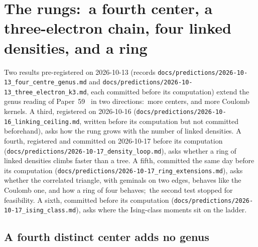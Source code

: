 \documentclass[aps,pra,twocolumn,superscriptaddress,longbibliography]{revtex4-2}
\begin{document}
\section{The rungs:\ a fourth center, a three-electron chain, four linked densities, and a ring}
\label{sec:beyond}

Two results pre-registered on 2026-10-13 (records
\texttt{docs/predictions/2026-10-13\_four\_centre\_genus.md} and
\texttt{docs/predictions/2026-10-13\_three\_electron\_k3.md}, each committed
before its computation) extend the genus reading of
Paper~59~\cite{loutey_paper59} in two directions:\ more centers, and more Coulomb
kernels.  A third, registered on 2026-10-16
(\texttt{docs/predictions/2026-10-16\_linking\_ceiling.md}, written before
its computation but not committed beforehand), asks how the rung grows with
the number of linked densities.  A fourth, registered and committed on
2026-10-17 before its computation
(\texttt{docs/predictions/2026-10-17\_density\_loop.md}), asks whether a
ring of linked densities climbs faster than a tree.  A fifth, committed the
same day before its computation
(\texttt{docs/predictions/2026-10-17\_ring\_extensions.md}), asks whether the
correlated triangle, with geminals on two edges, behaves like the Coulomb
one, and how a ring of four behaves;\ the second test stopped for feasibility.
A sixth, committed before its computation
(\texttt{docs/predictions/2026-10-17\_ising\_class.md}), asks where the
Ising-class moments sit on the ladder.

\subsection{A fourth distinct center adds no genus}
\label{sec:four_centre}
\end{document}
